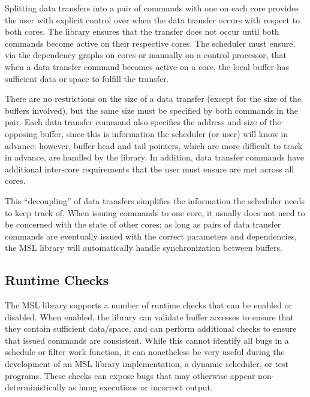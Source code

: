 Splitting data transfers into a pair of commands with one on each
core provides the user with explicit control over when the data
transfer occurs with respect to both cores. The library ensures
that the transfer does not occur until both commands become active on
their respective cores. The scheduler must ensure, via the
dependency graphs on cores or manually on a control processor, that
when a data transfer command becomes active on a core, the local
buffer has sufficient data or space to fulfill the transfer.


There are no restrictions on the size of a data transfer (except for
the size of the buffers involved), but the same size must be specified
by both commands in the pair. Each data transfer command also
specifies the address and size of the opposing buffer, since this is
information the scheduler (or user) will know in advance; however,
buffer head and tail pointers, which are more difficult to track in
advance, are handled by the library. In addition, data transfer
commands have additional inter-core requirements that the user must
ensure are met across all cores.

This ``decoupling'' of data transfers simplifies the information the
scheduler needs to keep track of. When issuing commands to one core,
it usually does not need to be concerned with the state of other
cores; as long as pairs of data transfer commands are eventually
issued with the correct parameters and dependencies, the MSL library
will automatically handle synchronization between buffers.

\subsection{Runtime Checks}

The MSL library supports a number of runtime checks that can be
enabled or disabled. When enabled, the library can validate buffer
accesses to ensure that they contain sufficient data/space, and can
perform additional checks to ensure that issued commands are
consistent. While this cannot identify all bugs in a schedule or
filter work function, it can nonetheless be very useful during the
development of an MSL library implementation, a dynamic scheduler, or
test programs. These checks can expose bugs that may otherwise appear
non-deterministically as hung executions or incorrect output.

